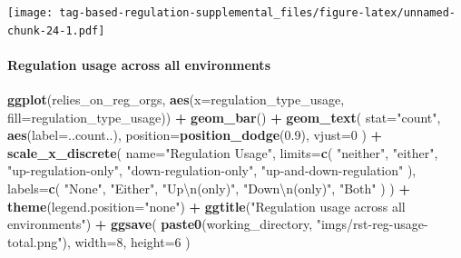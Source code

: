 \documentclass[
]{book}
\newenvironment{Shaded}{\begin{snugshade}}{\end{snugshade}}
\newcommand{\CharTok}[1]{\textcolor[rgb]{0.31,0.60,0.02}{#1}}
\newcommand{\DataTypeTok}[1]{\textcolor[rgb]{0.13,0.29,0.53}{#1}}
\newcommand{\DecValTok}[1]{\textcolor[rgb]{0.00,0.00,0.81}{#1}}
\newcommand{\FloatTok}[1]{\textcolor[rgb]{0.00,0.00,0.81}{#1}}
\newcommand{\KeywordTok}[1]{\textcolor[rgb]{0.13,0.29,0.53}{\textbf{#1}}}
\newcommand{\NormalTok}[1]{#1}
\newcommand{\OperatorTok}[1]{\textcolor[rgb]{0.81,0.36,0.00}{\textbf{#1}}}
\newcommand{\StringTok}[1]{\textcolor[rgb]{0.31,0.60,0.02}{#1}}
\begin{document}
\texttt{[image: tag-based-regulation-supplemental\_files/figure-latex/unnamed-chunk-24-1.pdf]}

\hypertarget{regulation-usage-across-all-environments}{%
\paragraph{Regulation usage across all environments}\label{regulation-usage-across-all-environments}}

\begin{Shaded}
\begin{Highlighting}[]
\KeywordTok{ggplot}\NormalTok{(relies\_on\_reg\_orgs, }\KeywordTok{aes}\NormalTok{(}\DataTypeTok{x=}\NormalTok{regulation\_type\_usage, }\DataTypeTok{fill=}\NormalTok{regulation\_type\_usage)) }\OperatorTok{+}
\StringTok{  }\KeywordTok{geom\_bar}\NormalTok{() }\OperatorTok{+}
\StringTok{  }\KeywordTok{geom\_text}\NormalTok{(}
    \DataTypeTok{stat=}\StringTok{"count"}\NormalTok{,}
    \KeywordTok{aes}\NormalTok{(}\DataTypeTok{label=}\NormalTok{..count..),}
    \DataTypeTok{position=}\KeywordTok{position\_dodge}\NormalTok{(}\FloatTok{0.9}\NormalTok{),}
    \DataTypeTok{vjust=}\DecValTok{0}
\NormalTok{  ) }\OperatorTok{+}
\StringTok{  }\KeywordTok{scale\_x\_discrete}\NormalTok{(}
    \DataTypeTok{name=}\StringTok{"Regulation Usage"}\NormalTok{,}
    \DataTypeTok{limits=}\KeywordTok{c}\NormalTok{(}
      \StringTok{"neither"}\NormalTok{,}
      \StringTok{"either"}\NormalTok{,}
      \StringTok{"up{-}regulation{-}only"}\NormalTok{,}
      \StringTok{"down{-}regulation{-}only"}\NormalTok{,}
      \StringTok{"up{-}and{-}down{-}regulation"}
\NormalTok{    ),}
    \DataTypeTok{labels=}\KeywordTok{c}\NormalTok{(}
      \StringTok{"None"}\NormalTok{,}
      \StringTok{"Either"}\NormalTok{,}
      \StringTok{"Up}\CharTok{\textbackslash{}n}\StringTok{(only)"}\NormalTok{,}
      \StringTok{"Down}\CharTok{\textbackslash{}n}\StringTok{(only)"}\NormalTok{,}
      \StringTok{"Both"}
\NormalTok{    )}
\NormalTok{  ) }\OperatorTok{+}
\StringTok{  }\KeywordTok{theme}\NormalTok{(}\DataTypeTok{legend.position=}\StringTok{"none"}\NormalTok{) }\OperatorTok{+}
\StringTok{  }\KeywordTok{ggtitle}\NormalTok{(}\StringTok{"Regulation usage across all environments"}\NormalTok{) }\OperatorTok{+}
\StringTok{  }\KeywordTok{ggsave}\NormalTok{(}
    \KeywordTok{paste0}\NormalTok{(working\_directory, }\StringTok{"imgs/rst{-}reg{-}usage{-}total.png"}\NormalTok{),}
    \DataTypeTok{width=}\DecValTok{8}\NormalTok{,}
    \DataTypeTok{height=}\DecValTok{6}
\NormalTok{  )}
\end{Highlighting}
\end{Shaded}
\end{document}
